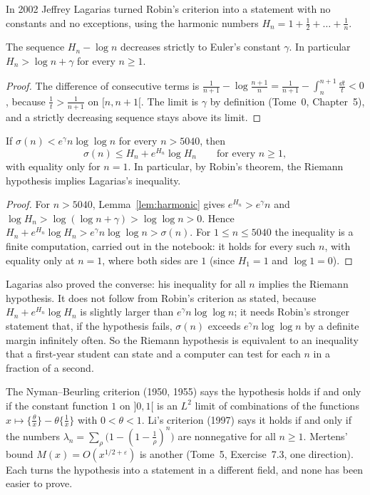 In 2002 Jeffrey Lagarias turned Robin's criterion into a statement with no constants and no exceptions, using the harmonic numbers
$H_n=1+\frac12+\dots+\frac1n$.

\begin{lemma}\label{lem:harmonic}
The sequence $H_n-\log n$ decreases strictly to Euler's constant $\gamma$. In particular $H_n>\log n+\gamma$ for every $n\ge1$.
\end{lemma}
\begin{proof}
The difference of consecutive terms is $\frac1{n+1}-\log\frac{n+1}n=\frac1{n+1}-\int_n^{n+1}\frac{\dd t}t<0$, because $\frac1t>\frac1{n+1}$ on $[n,n+1[$. The limit is $\gamma$
by definition (Tome~0, Chapter~5), and a strictly decreasing sequence stays above its limit.
\end{proof}

\begin{proposition}\label{prop:lagarias}
If $\sigma(n)<e^\gamma n\log\log n$ for every $n>5040$, then
\[
\sigma(n)\le H_n+e^{H_n}\log H_n\qquad\text{for every }n\ge1,
\]
with equality only for $n=1$. In particular, by Robin's theorem, the Riemann hypothesis implies Lagarias's inequality.
\end{proposition}
\begin{proof}
For $n>5040$, Lemma~\ref{lem:harmonic} gives $e^{H_n}>e^\gamma n$ and $\log H_n>\log(\log n+\gamma)>\log\log n>0$. Hence
$H_n+e^{H_n}\log H_n>e^\gamma n\log\log n>\sigma(n)$. For $1\le n\le5040$ the inequality is a finite computation, carried out in the notebook: it holds
for every such $n$, with equality only at $n=1$, where both sides are $1$ (since $H_1=1$ and $\log1=0$).
\end{proof}

Lagarias also proved the converse: his inequality for all $n$ implies the Riemann hypothesis. It does not follow from Robin's criterion as stated,
because $H_n+e^{H_n}\log H_n$ is slightly larger than $e^\gamma n\log\log n$; it needs Robin's stronger statement that, if the hypothesis fails,
$\sigma(n)$ exceeds $e^\gamma n\log\log n$ by a definite margin infinitely often. So the Riemann hypothesis is equivalent to an inequality that a
first-year student can state and a computer can test for each $n$ in a fraction of a second.

\begin{remark}
The Nyman--Beurling criterion (1950, 1955) says the hypothesis holds if and only if the constant function $1$ on $]0,1[$ is an $L^2$ limit of
combinations of the functions $x\mapsto\{\frac\theta x\}-\theta\{\frac1x\}$ with $0<\theta<1$. Li's criterion (1997) says it holds if and only if the numbers
$\lambda_n=\sum_\rho\bigl(1-(1-\frac1\rho)^n\bigr)$ are nonnegative for all $n\ge1$. Mertens' bound $M(x)=O(x^{1/2+\varepsilon})$ is another (Tome~5,
Exercise~7.3, one direction). Each turns the hypothesis into a statement in a different field, and none has been easier to prove.
\end{remark}

